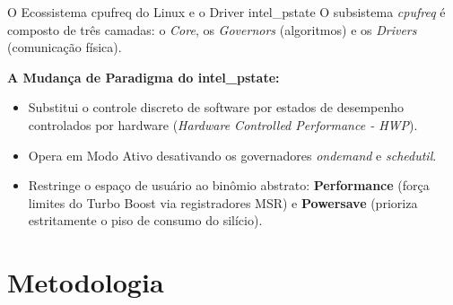 \documentclass[aspectratio=169,10pt]{beamer}
\begin{document}
\begin{frame}{O Ecossistema cpufreq do Linux e o Driver intel\_pstate}
    O subsistema \textit{cpufreq} é composto de três camadas: o \textit{Core}, os \textit{Governors} (algoritmos) e os \textit{Drivers} (comunicação física).

    \vspace{0.3cm}
    \textbf{A Mudança de Paradigma do intel\_pstate:}
    \begin{itemize}
        \item Substitui o controle discreto de software por estados de desempenho controlados por hardware (\textit{Hardware Controlled Performance - HWP}).
        \item Opera em Modo Ativo desativando os governadores \textit{ondemand} e \textit{schedutil}.
        \item Restringe o espaço de usuário ao binômio abstrato: \textbf{Performance} (força limites do Turbo Boost via registradores MSR) e \textbf{Powersave} (prioriza estritamente o piso de consumo do silício).
    \end{itemize}
\end{frame}


\section{Metodologia}
\end{document}
